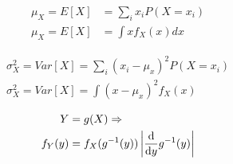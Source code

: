 \thispagestyle{empty}


\begin{minipage}[c]{0.3\textwidth}
\begin{align*}
  \mu_X = E[X] &= \sum_i x_i P(X=x_i)\\
  \mu_X = E[X] &= \int x f_X(x) dx
\end{align*}
\end{minipage}%
\begin{minipage}[c]{0.3\textwidth}
\begin{align*}
  \sigma^2_X = Var[X] = \sum_i (x_i-\mu_x)^2 P(X=x_i) \\
  \sigma^2_X = Var[X] = \int (x-\mu_x)^2  f_X(x)
\end{align*}
\end{minipage}%
\begin{minipage}[c]{0.3\textwidth}
\begin{align*}
  Y &= g(X) \Rightarrow \\
  f_Y(y) &= f_X(g^{-1}(y)) \left| \frac{{\rm d}}{{\rm d}y}g^{-1}(y)\right| 
\end{align*}
\end{minipage}


\vspace{0.3cm}

